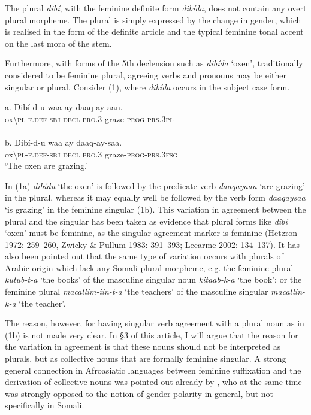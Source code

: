 \documentclass[output=paper]{langsci/langscibook}
\begin{document}
The plural \textit{dibí}, with the feminine definite form \textit{dibída}, does not contain any overt plural morpheme. The plural is simply expressed by the change in gender, which is realised in the form of the definite article and the typical feminine tonal accent on the last mora of the stem. 

Furthermore, with forms of the 5th declension such as \textit{dibída} ‘oxen’, traditionally considered to be feminine plural, agreeing verbs and pronouns may be either singular or plural. Consider (1), where \textit{dibída} occurs in the subject case form.

\ea
\ea
\gll \textup{a. } Dibí-d-u             waa  ay{\rmfnm}   daaq-ay-aan.   \\
        ox{\textbackslash}\textsc{pl-f.def-sbj  decl   pro.3}   graze-\textsc{prog-prs.3pl}\\
\ex
{}\\
\gll \textup{b.  }Dibí-d-u        waa  ay   daaq-ay-saa.    \\
       ox{\textbackslash}\textsc{pl-f.def-sbj  decl   pro.3}  graze-\textsc{prog-prs.3fsg}\\
\glt   ‘The oxen are grazing.’
\z
\z


In (1a) \textit{dibídu} ‘the oxen’ is followed by the predicate verb \textit{daaqayaan} ‘are grazing’ in the plural, whereas it may equally well be followed by the verb form \textit{daaqaysaa} ‘is grazing’ in the feminine singular (1b). This variation in agreement between the plural and the singular has been taken as evidence that plural forms like \textit{dibí} ‘oxen’ must be feminine, as the singular agreement marker is feminine (Hetzron 1972: 259{}--260, Zwicky \& Pullum 1983: 391{}--393; Lecarme 2002: 134{}--137). It has also been pointed out that the same type of variation occurs with plurals of Arabic origin which lack any Somali plural morpheme, e.g. the feminine plural \textit{kutub-t-a} ‘the books’ of the masculine singular noun \textit{kitaab-k-a} ‘the book’; or the feminine plural \textit{macallim-iin-t-a} ‘the teachers’ of the masculine singular \textit{macallin-k-a} ‘the teacher’.

The reason, however, for having singular verb agreement with a plural noun as in (1b) is not made very clear. In §3 of this article, I will argue that the reason for the variation in agreement is that these nouns should not be interpreted as plurals, but as collective nouns that are formally feminine singular. A strong general connection in Afroasiatic languages between feminine suffixation and the derivation of collective nouns was pointed out already by \citet{Speiser1938}, who at the same time was strongly opposed to the notion of gender polarity in general, but not specifically in Somali.
\end{document}
